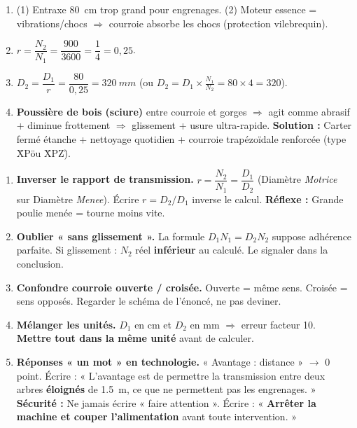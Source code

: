 \documentclass[11pt]{article}
\begin{document}
\begin{corrige}
\begin{enumerate}
\item (1) Entraxe \SI{80}{cm} trop grand pour engrenages. (2) Moteur essence = vibrations/chocs $\Rightarrow$ courroie absorbe les chocs (protection vilebrequin).
\item $r = \dfrac{N_2}{N_1} = \dfrac{900}{3600} = \dfrac{1}{4} = 0,25$.
\item $D_2 = \dfrac{D_1}{r} = \dfrac{80}{0,25} = \SI{320}{mm}$ (ou $D_2 = D_1 \times \frac{N_1}{N_2} = 80 \times 4 = 320$).
\item \textbf{Poussière de bois (sciure)} entre courroie et gorges $\Rightarrow$ agit comme abrasif + diminue frottement $\Rightarrow$ glissement + usure ultra-rapide. \textbf{Solution :} Carter fermé étanche + nettoyage quotidien + courroie trapézoïdale renforcée (type \"XP\" ou \"XPZ\").
\end{enumerate}
\end{corrige}

\begin{attention}
\begin{enumerate}
\item \textbf{Inverser le rapport de transmission.} $r = \dfrac{N_2}{N_1} = \dfrac{D_1}{D_2}$ (Diamètre \emph{Motrice} sur Diamètre \emph{Menee}). Écrire $r = D_2/D_1$ inverse le calcul. \textbf{Réflexe :} Grande poulie menée = tourne moins vite.
\item \textbf{Oublier « sans glissement ».} La formule $D_1 N_1 = D_2 N_2$ suppose adhérence parfaite. Si glissement : $N_2$ réel \textbf{inférieur} au calculé. Le signaler dans la conclusion.
\item \textbf{Confondre courroie ouverte / croisée.} Ouverte = même sens. Croisée = sens opposés. Regarder le schéma de l'énoncé, ne pas deviner.
\item \textbf{Mélanger les unités.} $D_1$ en cm et $D_2$ en mm $\Rightarrow$ erreur facteur 10. \textbf{Mettre tout dans la même unité} avant de calculer.
\item \textbf{Réponses « un mot » en technologie.} « Avantage : distance » $\rightarrow$ 0 point. Écrire : « L'avantage est de permettre la transmission entre deux arbres \textbf{éloignés} de \SI{1,5}{m}, ce que ne permettent pas les engrenages. » \textbf{Sécurité :} Ne jamais écrire « faire attention ». Écrire : « \textbf{Arrêter la machine et couper l'alimentation} avant toute intervention. »
\end{enumerate}
\end{attention}
\end{document}
